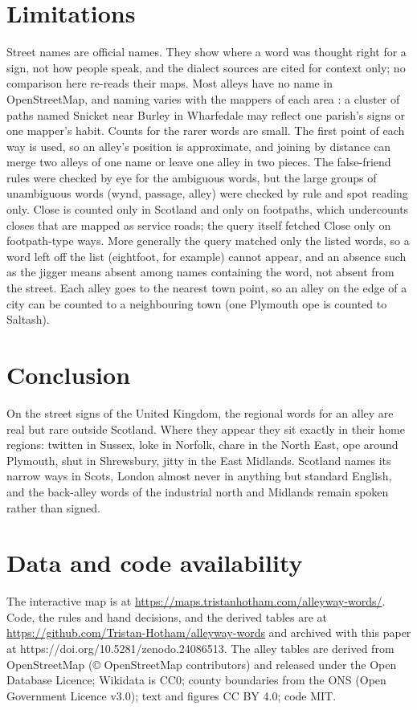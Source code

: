 \documentclass[11pt,a4paper]{article}
\begin{document}
\section{Limitations}
Street names are official names. They show where a word was thought right for a sign, not how people speak, and the dialect sources are cited for context only; no comparison here re-reads their maps. Most alleys have no name in OpenStreetMap, and naming varies with the mappers of each area \citep{haklay2010}: a cluster of paths named Snicket near Burley in Wharfedale may reflect one parish's signs or one mapper's habit. Counts for the rarer words are small. The first point of each way is used, so an alley's position is approximate, and joining by distance can merge two alleys of one name or leave one alley in two pieces. The false-friend rules were checked by eye for the ambiguous words, but the large groups of unambiguous words (wynd, passage, alley) were checked by rule and spot reading only. Close is counted only in Scotland and only on footpaths, which undercounts closes that are mapped as service roads; the query itself fetched Close only on footpath-type ways. More generally the query matched only the listed words, so a word left off the list (eightfoot, for example) cannot appear, and an absence such as the jigger means absent among names containing the word, not absent from the street. Each alley goes to the nearest town point, so an alley on the edge of a city can be counted to a neighbouring town (one Plymouth ope is counted to Saltash).

\section{Conclusion}
On the street signs of the United Kingdom, the regional words for an alley are real but rare outside Scotland. Where they appear they sit exactly in their home regions: twitten in Sussex, loke in Norfolk, chare in the North East, ope around Plymouth, shut in Shrewsbury, jitty in the East Midlands. Scotland names its narrow ways in Scots, London almost never in anything but standard English, and the back-alley words of the industrial north and Midlands remain spoken rather than signed.

\section*{Data and code availability}
The interactive map is at \url{https://maps.tristanhotham.com/alleyway-words/}. Code, the rules and hand decisions, and the derived tables are at \url{https://github.com/Tristan-Hotham/alleyway-words} and archived with this paper at https://doi.org/10.5281/zenodo.24086513. The alley tables are derived from OpenStreetMap (\copyright{} OpenStreetMap contributors) and released under the Open Database Licence; Wikidata is CC0; county boundaries from the ONS (Open Government Licence v3.0); text and figures CC BY 4.0; code MIT.
\end{document}
